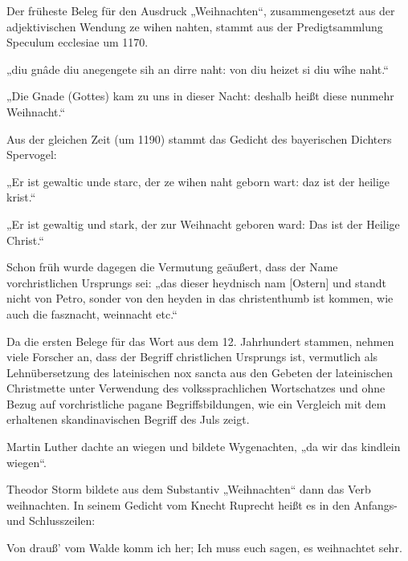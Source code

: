 Der früheste Beleg für den Ausdruck „Weihnachten“, zusammengesetzt aus der adjektivischen Wendung ze wihen nahten, stammt aus der Predigtsammlung Speculum ecclesiae um 1170.

    „diu gnâde diu anegengete sih an dirre naht: von diu heizet si diu wîhe naht.“

    „Die Gnade (Gottes) kam zu uns in dieser Nacht: deshalb heißt diese nunmehr Weihnacht.“

Aus der gleichen Zeit (um 1190) stammt das Gedicht des bayerischen Dichters Spervogel:

    „Er ist gewaltic unde starc, der ze wihen naht geborn wart: daz ist der heilige krist.“

    „Er ist gewaltig und stark, der zur Weihnacht geboren ward: Das ist der Heilige Christ.“


Schon früh wurde dagegen die Vermutung geäußert, dass der Name vorchristlichen Ursprungs sei: „das dieser heydnisch nam [Ostern] und standt nicht von Petro, sonder von den heyden in das christenthumb ist kommen, wie auch die fasznacht, weinnacht etc.“

Da die ersten Belege für das Wort aus dem 12. Jahrhundert stammen, nehmen viele Forscher an, dass der Begriff christlichen Ursprungs ist, vermutlich als Lehnübersetzung des lateinischen nox sancta aus den Gebeten der lateinischen Christmette unter Verwendung des volkssprachlichen Wortschatzes und ohne Bezug auf vorchristliche pagane Begriffsbildungen, wie ein Vergleich mit dem erhaltenen skandinavischen Begriff des Juls zeigt.

Martin Luther dachte an wiegen und bildete Wygenachten‚ „da wir das kindlein wiegen“.

Theodor Storm bildete aus dem Substantiv „Weihnachten“ dann das Verb weihnachten. In seinem Gedicht vom Knecht Ruprecht heißt es in den Anfangs- und Schlusszeilen:

Von drauß’ vom Walde komm ich her;
Ich muss euch sagen, es weihnachtet sehr.




